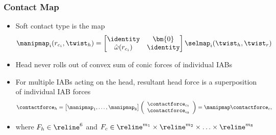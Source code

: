 \begin{frame}
	\frametitle{Contact Map}
	\begin{itemize}
		\item Soft contact type is the map
		\begin{align}
		\manipmap_i(r_{c_i}, \twist_h) = \begin{bmatrix}
		\identity & \bm{0} \\
		{\hat{\omega}}(r_{c_i}) & \identity
		\end{bmatrix} \selmap_i(\twist_h, \twist_r)
		\label{eq:force_constraint}
		\end{align}
		\item Head never rolls out of convex sum of conic forces of individual IABs
		\vspace{0.1in}
		\item For multiple IABs acting on the head, resultant head force is a superposition of individual IAB forces 	
		\begin{align}
		\contactforce_h = \begin{bmatrix}
		\manipmap_1, \ldots, \manipmap_8
		\end{bmatrix}
		\left(\begin{array}{c}
		\contactforce_{c_1} \\ \contactforce_{c_8}
		\end{array}\right) = \manipmap \contactforce_{c},
		\label{eq:head-contact-force}
		\end{align}
		\item where $F_h \in \reline^6$ and $F_c \in \reline^{m_1} \times \reline^{m_2} \times \ldots \times \reline^{m_8}$
	\end{itemize}
\end{frame}

